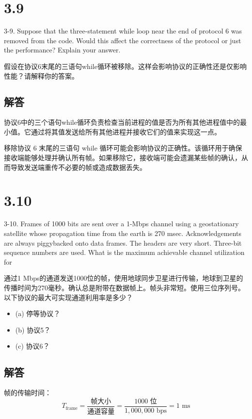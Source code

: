 \section{3.9}

3-9. Suppose that the three-statement while loop near the end of protocol 6 was removed from the code. Would this affect the correctness of the protocol or just the performance? Explain your answer.

假设在协议6末尾的三语句while循环被移除。这样会影响协议的正确性还是仅影响性能？请解释你的答案。

\subsection*{解答}

协议6中的三个语句while循环负责检查当前进程的值是否为所有其他进程值中的最小值。它通过将其值发送给所有其他进程并接收它们的值来实现这一点。

移除协议 6 末尾的三语句 while 循环可能会影响协议的正确性。该循环用于确保接收端能够处理并确认所有帧。如果移除它，接收端可能会遗漏某些帧的确认，从而导致发送端重传不必要的帧或造成数据丢失。


\section{3.10}

3-10. Frames of 1000 bits are sent over a 1-Mbps channel using a geostationary satellite whose propagation time from the earth is 270 msec. Acknowledgements are always piggybacked onto data frames. The headers are very short. Three-bit sequence numbers are used. What is the maximum achievable channel utilization for

通过1 Mbps的通道发送1000位的帧，使用地球同步卫星进行传输，地球到卫星的传播时间为270毫秒。确认总是附带在数据帧上。帧头非常短。使用三位序列号。以下协议的最大可实现通道利用率是多少？

\begin{itemize}
  \item (a) 停等协议？
  \item (b) 协议5？
  \item (c) 协议6？
\end{itemize}
\subsection*{解答}

帧的传输时间：
   \[
   T_{\text{frame}} = \frac{\text{帧大小}}{\text{通道容量}} = \frac{1000 \text{ 位}}{1,000,000 \text{ bps}} = 1 \text{ ms}
   \]

